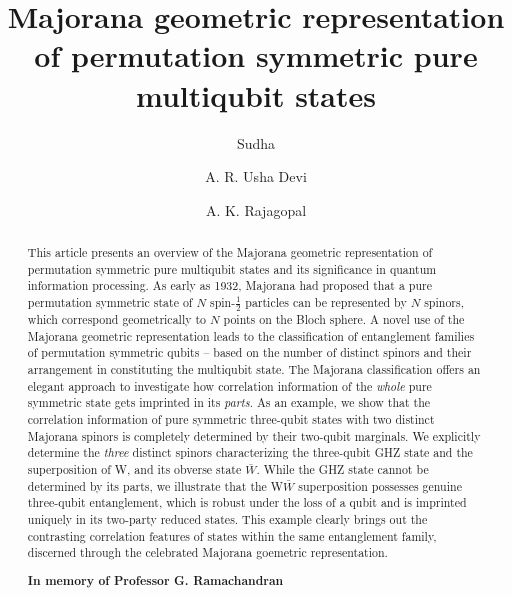 \documentclass[pra,preprint,a4paper,superscriptaddress]{revtex4}
\begin{document}
\title{Majorana geometric representation of permutation symmetric pure multiqubit states} 
\author{Sudha}
\author{A. R. Usha Devi}
\author{A. K. Rajagopal} 
\begin{abstract} 
This article presents an overview of the Majorana geometric representation of permutation symmetric  pure multiqubit states 
and its significance in quantum information processing. 
As early as 1932, Majorana had proposed that a pure permutation symmetric state of $N$ spin-$\frac{1}{2}$ particles can be represented by
$N$ spinors, which correspond geometrically to $N$ points on the Bloch sphere. A novel use of the Majorana geometric representation leads  to the classification of entanglement families of permutation symmetric qubits -- based on the number of distinct  spinors  and their arrangement in constituting the multiqubit state. The Majorana classification offers an elegant approach to investigate how correlation information of the {\em whole}  pure symmetric state gets imprinted in its {\em parts}. As an example, we show that the correlation information of pure symmetric three-qubit states with two distinct Majorana spinors is completely determined by their two-qubit marginals. We explicitly determine the {\emph {three}} distinct spinors characterizing the three-qubit GHZ state and the superposition of W, and its obverse state $\bar W$. While the GHZ state cannot be determined by its parts, we illustrate that the W$\bar W$ superposition possesses genuine three-qubit entanglement, which is robust under the loss of a qubit and is imprinted uniquely in its two-party reduced states. This example clearly brings out the contrasting correlation features of states within the same entanglement family, discerned through the celebrated Majorana goemetric representation.  

\vskip 1.1in
\begin{center} 
	{\bf \large In memory of Professor G. Ramachandran}
\end{center}
 \end{abstract}
\end{document}
